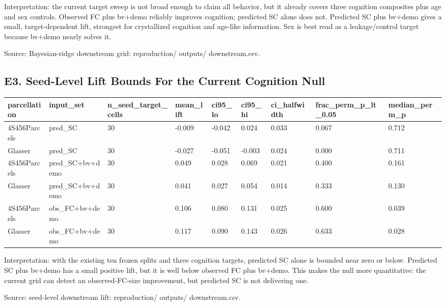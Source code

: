 Interpretation: the current target sweep is not broad enough to claim all behavior, but it already covers three cognition composites plus age and sex controls. Observed FC plus bv+demo reliably improves cognition; predicted SC alone does not. Predicted SC plus bv+demo gives a small, target-dependent lift, strongest for crystallized cognition and age-like information. Sex is best read as a leakage/control target because bv+demo nearly solves it.

Source: Bayesian-ridge downstream grid: reproduction/ outputs/ downstream.csv.

\subsection{E3. Seed-Level Lift Bounds For the Current Cognition Null}\label{e3-seed-level-lift-bounds-for-the-current-cognition-null}

{\def\LTcaptype{none} %
\begin{longtable}[]{@{}lllllllll@{}}
\toprule\noalign{}
parcellation & input\_set & n\_seed\_target\_cells & mean\_lift & ci95\_lo & ci95\_hi & ci\_halfwidth & frac\_perm\_p\_lt\_0.05 & median\_perm\_p \\
\midrule\noalign{}
\endhead
\bottomrule\noalign{}
\endlastfoot
4S456Parcels & pred\_SC & 30 & -0.009 & -0.042 & 0.024 & 0.033 & 0.067 & 0.712 \\
Glasser & pred\_SC & 30 & -0.027 & -0.051 & -0.003 & 0.024 & 0.000 & 0.711 \\
4S456Parcels & pred\_SC+bv+demo & 30 & 0.049 & 0.028 & 0.069 & 0.021 & 0.400 & 0.161 \\
Glasser & pred\_SC+bv+demo & 30 & 0.041 & 0.027 & 0.054 & 0.014 & 0.333 & 0.130 \\
4S456Parcels & obs\_FC+bv+demo & 30 & 0.106 & 0.080 & 0.131 & 0.025 & 0.600 & 0.039 \\
Glasser & obs\_FC+bv+demo & 30 & 0.117 & 0.090 & 0.143 & 0.026 & 0.633 & 0.028 \\
\end{longtable}
}

Interpretation: with the existing ten frozen splits and three cognition targets, predicted SC alone is bounded near zero or below. Predicted SC plus bv+demo has a small positive lift, but it is well below observed FC plus bv+demo. This makes the null more quantitative: the current grid can detect an observed-FC-size improvement, but predicted SC is not delivering one.

Source: seed-level downstream lift: reproduction/ outputs/ downstream.csv.

